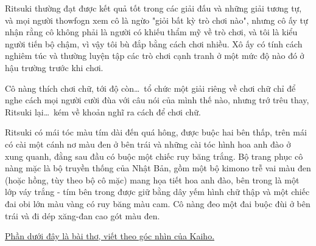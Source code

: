 \documentclass[../main.tex]{subfiles}
\begin{document}
Ritsuki thường đạt được kết quả tốt trong các giải đấu và những giải tương tự, và mọi người thowfogn xem cô là ngừo "giỏi bất kỳ trò chơi nào", nhưng cô ấy tự nhận rằng cô không phải là người có khiếu thẩm mỹ về trò chơi, và tôi là kiểu người tiến bộ chậm, vì vậy tôi bù đắp bằng cách chơi nhiều. Xô ấy có tính cách nghiêm túc và thường luyện tập các trò chơi cạnh tranh ở một mức độ nào đó ở hậu trường trước khi chơi.

Cô nàng thích chơi chữ, tới độ còn\dots\ tổ chức một giải riêng về chơi chữ chỉ để nghe cách mọi người cười đùa với câu nói của mình thế nào, nhưng trớ trêu thay, Ritsuki lại\dots\ kém về khoản nghĩ ra cách để chơi chữ.

Ritsuki có mái tóc màu tím dài đến quá hông, được buộc hai bên thấp, trên mái có cài một cánh nơ màu đen ở bên trái và những cài tóc hình hoa anh đào ở xung quanh, đằng sau đầu có buộc một chiếc ruy băng trắng. Bộ trang phục cô nàng mặc là bộ truyền thống của Nhật Bản, gồm một bộ kimono trễ vai màu đen (hoặc hồng, tùy theo bộ cô mặc) mang họa tiết hoa anh đào, bên trong là một lớp váy trắng - tím bên trong được giữ bằng dây yếm hình chữ thập và một chiếc đai obi lớn màu vàng có ruy băng màu cam. Cô nàng đeo một đai buộc đùi ở bên trái và đi dép xăng-đan cao gót màu đen.

\chrint

\begin{center}
  \uline{Phần dưới đây là bài thơ, viết theo góc nhìn của Kaiho.}
\end{center}
\end{document}
